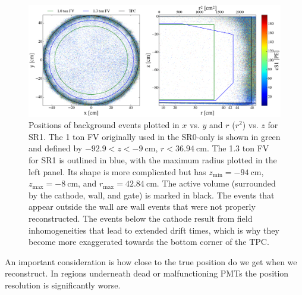 \begin{figure}
\centering
\includegraphics[width=\textwidth]{FVBoth}
\caption{Positions of background events plotted in $x$ vs. $y$ and $r$ ($r^2$) vs. $z$ for SR1.  The 1 ton FV originally used
in the SR0-only is shown in green and defined by $-92.9 < z < -9\ \mathrm{cm}$, $r < 36.94\ \mathrm{cm}$.  The 1.3 ton FV for SR1 is
outlined in
blue, with the maximum radius plotted in the left panel.  Its shape is more complicated but has $z_\mathrm{min} = -94\ \mathrm{cm}$,
$z_{\mathrm{max}} = -8\ \mathrm{cm}$, and $r_{\mathrm{max}} = 42.84\ \mathrm{cm}$.  The active volume (surrounded by the cathode, wall,
and gate) is marked in black.  The events that appear outside the wall are wall events that were not properly
reconstructed.  The events below the cathode result from field inhomogeneities that lead to extended drift times, which is why they
become more exaggerated towards the bottom corner of the TPC.}
\label{fig:calibrations_position_reconstruction}
\end{figure}

An important consideration is how close to the true position do we get when we reconstruct.  In regions underneath dead or malfunctioning
PMTs the position resolution is significantly worse.

